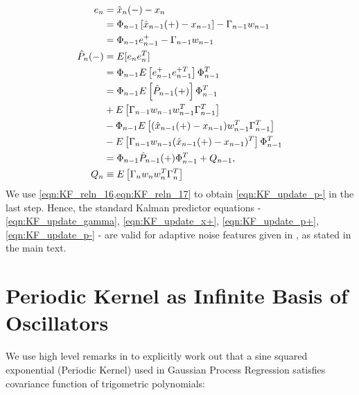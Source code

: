 \begin{align}
e_n &= \hat{x}_{n}(-) - x_n \\
&= \Phi_{n-1}\left[\hat{x}_{n-1}(+) - x_{n-1} \right] - \Gamma_{n-1}w_{n-1} \\
&= \Phi_{n-1}e^{+}_{n-1} - \Gamma_{n-1}w_{n-1} \\
\hat{P}_{n}(-) &= E[e_ne_n^T] \\
&= \Phi_{n-1}E\left[e^{+}_{n-1}e^{+T}_{n-1}\right]\Phi_{n-1}^T  \\
&= \Phi_{n-1}E\left[\hat{P}_{n-1}(+)\right]\Phi_{n-1}^T  \\
& + E\left[\Gamma_{n-1}w_{n-1}w_{n-1}^T\Gamma_{n-1}^T\right] \nonumber \\
& - \Phi_{n-1}E\left[(\hat{x}_{n-1}(+) - x_{n-1})w_{n-1}^T\Gamma_{n-1}^T\right] \nonumber \\
& - E\left[\Gamma_{n-1}w_{n-1}(\hat{x}_{n-1}(+) - x_{n-1})^T\right]\Phi_{n-1}^T  \nonumber  \\
&= \Phi_{n-1} \hat{P}_{n-1}(+) \Phi_{n-1}^T + Q_{n-1}, \label{eqn:KF_update_p-} \\
Q_{n} & \equiv E\left[\Gamma_{n}w_{n}w_{n}^T\Gamma_{n}^T\right] 
\end{align}
We use \cref{eqn:KF_reln_16,eqn:KF_reln_17} to obtain \cref{eqn:KF_update_p-} in the last step. Hence, the standard Kalman predictor equations - \ref{eqn:KF_update_gamma}, \ref{eqn:KF_update_x+}, \ref{eqn:KF_update_p+}, \ref{eqn:KF_update_p-} - are valid for adaptive noise features given in \cite{livska2007}, as stated in the main text. 

\section{Periodic Kernel as Infinite Basis of Oscillators} \label{sec:ap_approxSP:GPRPKernel}

We use high level remarks in \cite{solin2014explicit} to explicitly work out that a sine squared exponential (Periodic Kernel) used in Gaussian Process Regression satisfies covariance function of trigometric polynomials:

